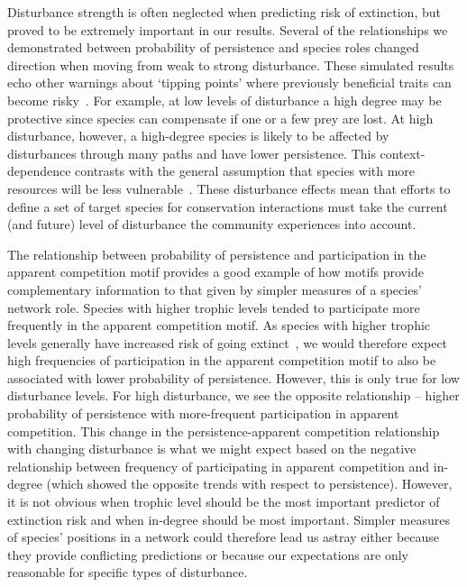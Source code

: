 \documentclass[12pt]{article}
\begin{document}
\begin{spacing}{2.0}
    Disturbance strength is often neglected when predicting risk of extinction, but proved to be extremely important in our results.
    Several of the relationships we demonstrated between probability of persistence and species roles changed direction when moving from weak to strong disturbance.
    These simulated results echo other warnings about `tipping points' where previously beneficial traits can become risky~\citep{Latty2019,Golubski2016,Tylianakis2014}.
    For example, at low levels of disturbance a high degree may be protective since species can compensate if one or a few prey are lost. 
    At high disturbance, however, a high-degree species is likely to be affected by disturbances through many paths and have lower persistence.
    This context-dependence contrasts with the general assumption that species with more resources will be less vulnerable~\citep{binzer2011susceptibility}.
    These disturbance effects mean that efforts to define a set of target species for conservation interactions must take the current (and future) level of disturbance the community experiences into account.
    

    The relationship between probability of persistence and participation in the apparent competition motif provides a good example of how motifs provide complementary information to that given by simpler measures of a species' network role.
    Species with higher trophic levels tended to participate more frequently in the apparent competition motif.
    As species with higher trophic levels generally have increased risk of going extinct~\citep{Eklof2006,Eklof2013}, we would therefore expect high frequencies of participation in the apparent competition motif to also be associated with lower probability of persistence.
    However, this is only true for low disturbance levels. 
    For high disturbance, we see the opposite relationship – higher probability of persistence with more-frequent participation in apparent competition.
    This change in the persistence-apparent competition relationship with changing disturbance is what we might expect based on the negative relationship between frequency of participating in apparent competition and in-degree (which showed the opposite trends with respect to persistence).
    However, it is not obvious when trophic level should be the most important predictor of extinction risk and when in-degree should be most important.
    Simpler measures of species' positions in a network could therefore lead us astray either because they provide conflicting predictions or because our expectations are only reasonable for specific types of disturbance.



\end{spacing}
\end{document}
